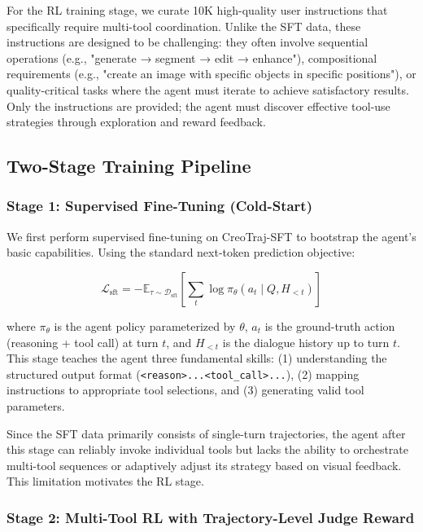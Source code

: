 \documentclass[11pt]{article}
\begin{document}
For the RL training stage, we curate 10K high-quality user instructions that specifically require multi-tool coordination. Unlike the SFT data, these instructions are designed to be challenging: they often involve sequential operations (e.g., "generate → segment → edit → enhance"), compositional requirements (e.g., "create an image with specific objects in specific positions"), or quality-critical tasks where the agent must iterate to achieve satisfactory results. Only the instructions are provided; the agent must discover effective tool-use strategies through exploration and reward feedback.

\subsection{Two-Stage Training Pipeline}

\subsubsection{Stage 1: Supervised Fine-Tuning (Cold-Start)}

We first perform supervised fine-tuning on CreoTraj-SFT to bootstrap the agent's basic capabilities. Using the standard next-token prediction objective:

$$\mathcal{L}_{\text{sft}} = -\mathbb{E}_{\tau \sim \mathcal{D}_{\text{sft}}} \left[ \sum_{t} \log \pi_\theta(a_t \mid Q, H_{<t}) \right]$$

where $\pi_\theta$ is the agent policy parameterized by $\theta$, $a_t$ is the ground-truth action (reasoning + tool call) at turn $t$, and $H_{<t}$ is the dialogue history up to turn $t$. This stage teaches the agent three fundamental skills: (1) understanding the structured output format (\texttt{<reason>...<tool\_call>...}), (2) mapping instructions to appropriate tool selections, and (3) generating valid tool parameters.

Since the SFT data primarily consists of single-turn trajectories, the agent after this stage can reliably invoke individual tools but lacks the ability to orchestrate multi-tool sequences or adaptively adjust its strategy based on visual feedback. This limitation motivates the RL stage.

\subsubsection{Stage 2: Multi-Tool RL with Trajectory-Level Judge Reward}

\label{sec:rl}
\end{document}
